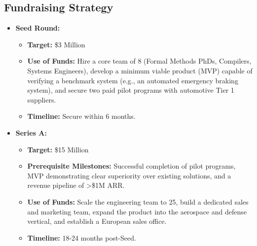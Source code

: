 \documentclass{article}
\begin{document}
\subsection{Fundraising Strategy}
\begin{itemize}
    \item \textbf{Seed Round:}
        \begin{itemize}
            \item \textbf{Target:} \$3 Million
            \item \textbf{Use of Funds:} Hire a core team of 8 (Formal Methods PhDs, Compilers, Systems Engineers), develop a minimum viable product (MVP) capable of verifying a benchmark system (e.g., an automated emergency braking system), and secure two paid pilot programs with automotive Tier 1 suppliers.
            \item \textbf{Timeline:} Secure within 6 months.
        \end{itemize}
    \item \textbf{Series A:}
        \begin{itemize}
            \item \textbf{Target:} \$15 Million
            \item \textbf{Prerequisite Milestones:} Successful completion of pilot programs, MVP demonstrating clear superiority over existing solutions, and a revenue pipeline of >\$1M ARR.
            \item \textbf{Use of Funds:} Scale the engineering team to 25, build a dedicated sales and marketing team, expand the product into the aerospace and defense vertical, and establish a European sales office.
            \item \textbf{Timeline:} 18-24 months post-Seed.
        \end{itemize}
\end{itemize}
\end{document}
